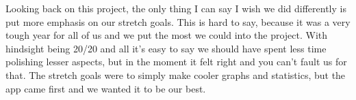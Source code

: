 \par Looking back on this project, the only thing I can say I wish we did differently is put more emphasis on our stretch goals.
This is hard to say, because it was a very tough year for all of us and we put the most we could into the project.
With hindsight being 20/20 and all it's easy to say we should have spent less time polishing lesser aspects, but in the moment it felt right and you can't fault us for that.
The stretch goals were to simply make cooler graphs and statistics, but the app came first and we wanted it to be our best. 
